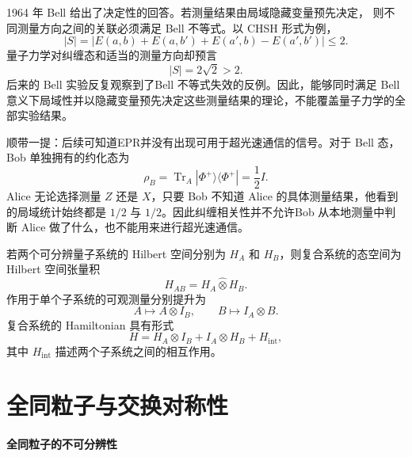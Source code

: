 \documentclass[UTF8,a4paper,11pt,openany]{ctexbook}
\begin{document}
\begin{tcolorbox}
1964 年 Bell 给出了决定性的回答。若测量结果由局域隐藏变量预先决定，
则不同测量方向之间的关联必须满足 Bell 不等式。以 CHSH 形式为例，
\begin{equation}
    |S|
    =
    \left|
        E(a,b)+E(a,b')
        +E(a',b)-E(a',b')
    \right|
    \leq2.
\end{equation}
量子力学对纠缠态和适当的测量方向却预言
\begin{equation}
    |S|=2\sqrt2>2.
\end{equation}
后来的 Bell 实验反复观察到了Bell 不等式失效的反例。因此，能够同时满足 Bell 意义下局域性并以隐藏变量预先决定这些测量结果的理论，不能覆盖量子力学的全部实验结果。

顺带一提：后续可知道EPR并没有出现可用于超光速通信的信号。对于 Bell 态，Bob 单独拥有的约化态为
\begin{equation}
    \rho_B
    =
    \operatorname{Tr}_A
    |\Phi^+\rangle\langle\Phi^+|
    =
    \frac12 I.
\end{equation}
Alice 无论选择测量 $Z$ 还是 $X$，只要 Bob 不知道 Alice 的具体测量结果，他看到的局域统计始终都是 $1/2$ 与 $1/2$。因此纠缠相关性并不允许Bob 从本地测量中判断 Alice 做了什么，也不能用来进行超光速通信。
\end{tcolorbox}


\begin{proposition}
若两个可分辨量子系统的 Hilbert 空间分别为 $H_A$ 和 $H_B$，则复合系统的态空间为 Hilbert 空间张量积
\begin{equation}
    H_{AB}
    =
    H_A\widehat{\otimes}H_B.
\end{equation}
作用于单个子系统的可观测量分别提升为
\[
A\longmapsto A\otimes I_B,
\qquad
B\longmapsto I_A\otimes B.
\]
复合系统的 Hamiltonian 具有形式
\begin{equation}
    H
    =
    H_A\otimes I_B
    +
    I_A\otimes H_B
    +
    H_{\mathrm{int}},
\end{equation}
其中 $H_{\mathrm{int}}$ 描述两个子系统之间的相互作用。
\end{proposition}

\section{全同粒子与交换对称性}

\paragraph{全同粒子的不可分辨性}
\end{document}
